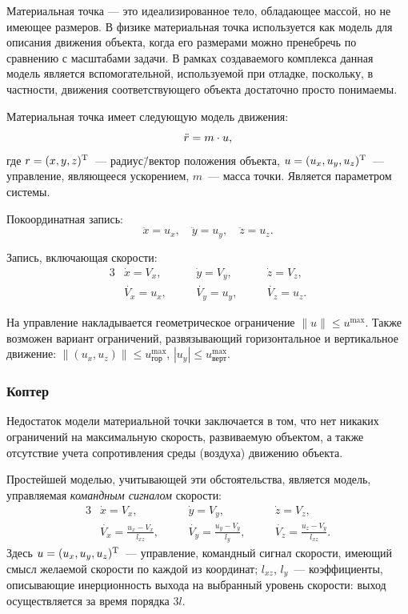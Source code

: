 \documentclass[a4paper,12pt]{article}
\numberwithin{figure}{subsubsection}
\begin{document}
Материальная точка --- это идеализированное тело, обладающее массой, но не имеющее размеров. В физике материальная точка используется как модель для описания движения объекта, когда его размерами можно пренебречь по сравнению с масштабами задачи. В рамках создаваемого комплекса данная модель является вспомогательной, используемой при отладке, поскольку, в частности, движения соответствующего объекта достаточно просто понимаемы.

Материальная точка имеет следующую модель движения:
\begin{equation}
    \Ddot{r} = m \cdot u,
\end{equation}
где $r = (x, y, z)^\text{\textup{T}}$~--- радиус\=/вектор положения объекта, $u = (u_x, u_y, u_z)^\text{\textup{T}}$~--- управление, являющееся ускорением, $m$~--- масса точки. Является параметром системы.

Покоординатная запись:
\begin{equation*}
  \ddot{x} = u_x, \quad \ddot{y} = u_y, \quad \ddot{z} = u_z.
\end{equation*}

Запись, включающая скорости:
\begin{alignat*}{3}
  & \dot{x} = V_x,  & \quad & \dot{y} = V_y, & \quad & \dot{z} = V_z, \\
  & \dot{V_x} = u_x, & & \dot{V_y} = u_y, & & \dot{V_z} = u_z.
\end{alignat*}

На управление накладывается геометрическое ограничение $\|u\| \leqslant u^{\max}$. Также возможен вариант ограничений, развязывающий горизонтальное и вертикальное движение: $\big\|(u_x,u_z)\big\| \leqslant u^{\max}_\text{гор}$, $|u_y| \leqslant u^{\max}_\text{верт}$.


\subsubsection{Коптер}  

Недостаток модели материальной точки заключается в том, что нет никаких ограничений на максимальную скорость, развиваемую объектом, а также отсутствие учета сопротивления среды (воздуха) движению объекта.

Простейшей моделью, учитывающей эти обстоятельства, является модель, управляемая \textit{командным сигналом} скорости:
\begin{alignat*}{3}
  & \dot{x} = V_x, & \quad & \dot{y} = V_y, & \quad
    & \dot{z} = V_z, \\
  & \displaystyle
    \dot{V_x} = \frac{u_x - V_x}{l_{xz}},  & &
    \dot{V_y} = \frac{u_y - V_y}{l_{y}},   & &
    \dot{V_z} = \frac{u_z - V_y}{l_{xz}}.
\end{alignat*}
Здесь $u = (u_x, u_y, u_z)^\text{\textup{T}}$~--- управление, командный сигнал скорости, имеющий смысл желаемой скорости по каждой из координат; $l_{xz}$, $l_y$~--- коэффициенты, описывающие инерционность выхода на выбранный уровень скорости: выход осуществляется за время порядка $3l$. 
\end{document}
